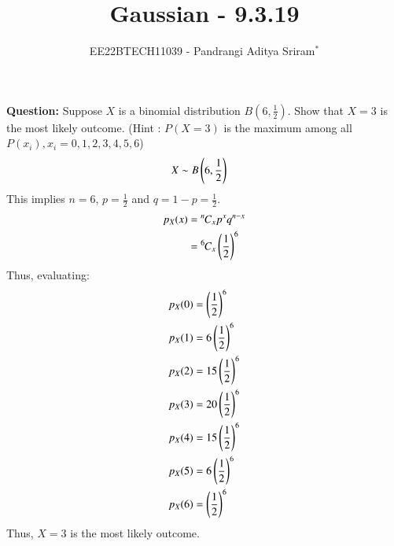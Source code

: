 \documentclass[journal,12pt,twocolumn]{IEEEtran}
\theoremstyle{remark}
\begin{document}

\vspace{3cm}

\title{Gaussian - 9.3.19}
\author{EE22BTECH11039 - Pandrangi Aditya Sriram$^{*}$%
}
\maketitle
\newpage
\bigskip

\renewcommand{\thefigure}{\theenumi}
\renewcommand{\thetable}{\theenumi}


\vspace{3cm}
\textbf{Question:} Suppose $X$ is a binomial distribution $B\left(6,\frac{1}{2}\right)$. Show that $X=3$ is the most likely outcome.
(Hint : $P(X=3)$ is the maximum among all $P(x_i),x_i=0,1,2,3,4,5,6$)\\
\solution
\begin{align}
    X &\sim B\left(6,\frac{1}{2}\right)
\end{align}
This implies $n = 6$, $p = \frac{1}{2}$ and $q = 1 - p = \frac{1}{2}$. 
\begin{align}
    p_X(x) &= {{}^{n}\mkern-1muC_{x}}p^xq^{n-x}\\
    &= {{}^{6}\mkern-1muC_{x}} \left(\frac{1}{2}\right)^6
\end{align}
Thus, evaluating:
\begin{align}
    p_X(0) &= \left(\frac{1}{2}\right)^6\\
    p_X(1) &= 6 \left(\frac{1}{2}\right)^6\\
    p_X(2) &= 15 \left(\frac{1}{2}\right)^6\\
    p_X(3) &= 20 \left(\frac{1}{2}\right)^6\\
    p_X(4) &= 15 \left(\frac{1}{2}\right)^6\\
    p_X(5) &= 6 \left(\frac{1}{2}\right)^6\\
    p_X(6) &= \left(\frac{1}{2}\right)^6
\end{align}
Thus, $X = 3$ is the most likely outcome.
\end{document}
